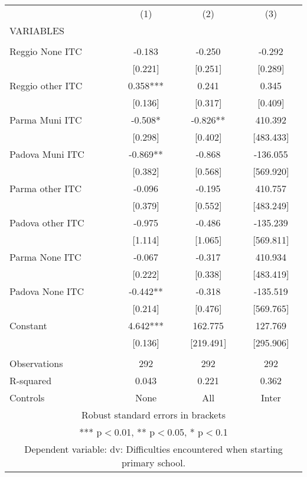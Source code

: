 \begin{tabular}{lccc} \hline
 & (1) & (2) & (3) \\
VARIABLES &  &  &  \\ \hline
 &  &  &  \\
Reggio None ITC & -0.183 & -0.250 & -0.292 \\
 & [0.221] & [0.251] & [0.289] \\
Reggio other ITC & 0.358*** & 0.241 & 0.345 \\
 & [0.136] & [0.317] & [0.409] \\
Parma Muni ITC & -0.508* & -0.826** & 410.392 \\
 & [0.298] & [0.402] & [483.433] \\
Padova Muni ITC & -0.869** & -0.868 & -136.055 \\
 & [0.382] & [0.568] & [569.920] \\
Parma other ITC & -0.096 & -0.195 & 410.757 \\
 & [0.379] & [0.552] & [483.249] \\
Padova other ITC & -0.975 & -0.486 & -135.239 \\
 & [1.114] & [1.065] & [569.811] \\
Parma None ITC & -0.067 & -0.317 & 410.934 \\
 & [0.222] & [0.338] & [483.419] \\
Padova None ITC & -0.442** & -0.318 & -135.519 \\
 & [0.214] & [0.476] & [569.765] \\
Constant & 4.642*** & 162.775 & 127.769 \\
 & [0.136] & [219.491] & [295.906] \\
 &  &  &  \\
Observations & 292 & 292 & 292 \\
R-squared & 0.043 & 0.221 & 0.362 \\
 Controls & None & All & Inter \\ \hline
\multicolumn{4}{c}{ Robust standard errors in brackets} \\
\multicolumn{4}{c}{ *** p$<$0.01, ** p$<$0.05, * p$<$0.1} \\
\multicolumn{4}{c}{ Dependent variable: dv: Difficulties encountered when starting primary school.} \\
\end{tabular}
